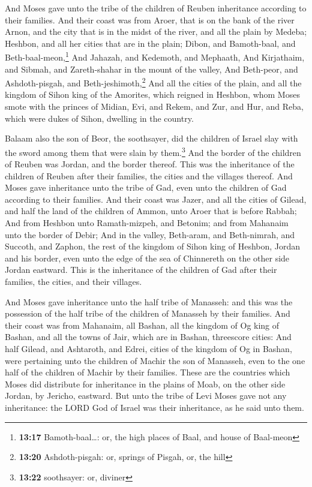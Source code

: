  And Moses gave unto the tribe of the children of Reuben
inheritance according to their families.  And their coast
was from Aroer, that is on the bank of the river Arnon, and the city
that is in the midst of the river, and all the plain by Medeba;
 Heshbon, and all her cities that are in the plain;
Dibon, and Bamoth-baal, and Beth-baal-meon,\footnote{\textbf{13:17}
  Bamoth-baal\ldots: or, the high places of Baal, and house of Baal-meon}
 And Jahazah, and Kedemoth, and Mephaath, 
And Kirjathaim, and Sibmah, and Zareth-shahar in the mount of the
valley,  And Beth-peor, and Ashdoth-pisgah, and
Beth-jeshimoth,\footnote{\textbf{13:20} Ashdoth-pisgah: or, springs of
  Pisgah, or, the hill}  And all the cities of the plain,
and all the kingdom of Sihon king of the Amorites, which reigned in
Heshbon, whom Moses smote with the princes of Midian, Evi, and Rekem,
and Zur, and Hur, and Reba, which were dukes of Sihon, dwelling in the
country.

 Balaam also the son of Beor, the soothsayer, did the
children of Israel slay with the sword among them that were slain by
them.\footnote{\textbf{13:22} soothsayer: or, diviner} 
And the border of the children of Reuben was Jordan, and the border
thereof. This was the inheritance of the children of Reuben after their
families, the cities and the villages thereof.  And Moses
gave inheritance unto the tribe of Gad, even unto the children of Gad
according to their families.  And their coast was Jazer,
and all the cities of Gilead, and half the land of the children of
Ammon, unto Aroer that is before Rabbah;  And from
Heshbon unto Ramath-mizpeh, and Betonim; and from Mahanaim unto the
border of Debir;  And in the valley, Beth-aram, and
Beth-nimrah, and Succoth, and Zaphon, the rest of the kingdom of Sihon
king of Heshbon, Jordan and his border, even unto the edge of the sea of
Chinnereth on the other side Jordan eastward.  This is
the inheritance of the children of Gad after their families, the cities,
and their villages.

 And Moses gave inheritance unto the half tribe of
Manasseh: and this was the possession of the half tribe of the children
of Manasseh by their families.  And their coast was from
Mahanaim, all Bashan, all the kingdom of Og king of Bashan, and all the
towns of Jair, which are in Bashan, threescore cities: 
And half Gilead, and Ashtaroth, and Edrei, cities of the kingdom of Og
in Bashan, were pertaining unto the children of Machir the son of
Manasseh, even to the one half of the children of Machir by their
families.  These are the countries which Moses did
distribute for inheritance in the plains of Moab, on the other side
Jordan, by Jericho, eastward.  But unto the tribe of Levi
Moses gave not any inheritance: the LORD God of Israel was their
inheritance, as he said unto them.

